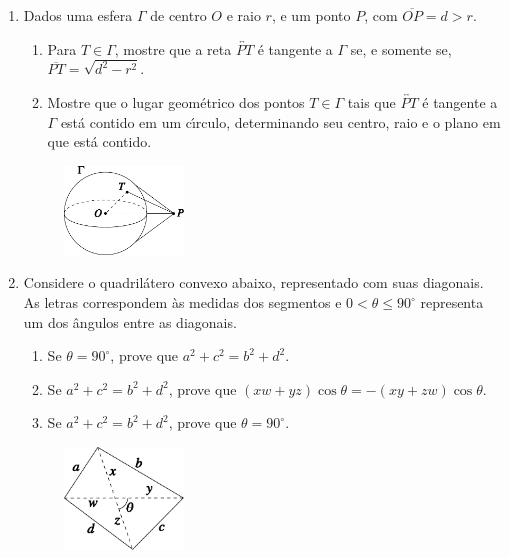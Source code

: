\documentclass[a4paper,5pt]{amsbook}
\begin{document}
\begin{enumerate}
    \item Dados uma esfera $\Gamma$ de centro $O$ e raio $r$, e um ponto $P$,
        com $\overline{OP} = d>r$.
        \begin{enumerate}
            \vspace{0.3cm}
            \item Para $T\in\Gamma$, mostre que a reta
                $\overleftrightarrow{PT}$ \'e tangente a $\Gamma$ se, e somente
                se, $\overline{PT} = \sqrt{d^2-r^2}$.
            \vspace{0.3cm}
            \item Mostre que o lugar geom\'etrico dos pontos $T\in\Gamma$ tais
                que $\overleftrightarrow{PT}$ \'e tangente a $\Gamma$ est\'a
                contido em um c\'{\i}rculo, determinando seu centro, raio e o plano
                em que est\'a contido.
        \end{enumerate}
        \begin{figure}[!h]
            \centering
            \includegraphics[width=0.3\textwidth]{fig05-3.pdf}
        \end{figure}

    \newpage
    \item Considere o quadril\'atero convexo abaixo, representado com suas
        diagonais. As letras correspondem \`as medidas dos segmentos e $0 <
        \theta \le 90^\circ$ representa um dos \^angulos entre as diagonais.
        \begin{enumerate}
            \vspace{0.3cm}
            \item Se $\theta = 90^\circ$, prove que $a^2+c^2 = b^2+d^2$.
            \vspace{0.3cm}
            \item Se $a^2+c^2 = b^2+d^2$, prove que $(xw+yz)\cos\theta =
                -(xy+zw)\cos\theta$.
            \vspace{0.3cm}
            \item Se $a^2+c^2 = b^2+d^2$, prove que $\theta = 90^\circ$.
        \end{enumerate}
        \begin{figure}[!h]
            \centering
            \includegraphics[width=0.3\textwidth]{fig05-4.pdf}
        \end{figure}


\end{enumerate}
\end{document}
